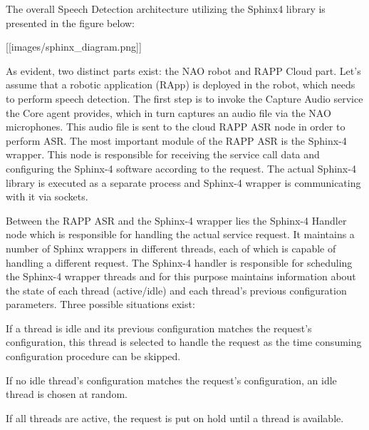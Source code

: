 The overall Speech Detection architecture utilizing the Sphinx4 library is presented in the figure below\-:

\mbox{[}\mbox{[}images/sphinx\-\_\-diagram.\-png\mbox{]}\mbox{]}

As evident, two distinct parts exist\-: the N\-A\-O robot and R\-A\-P\-P Cloud part. Let’s assume that a robotic application (R\-App) is deployed in the robot, which needs to perform speech detection. The first step is to invoke the Capture Audio service the Core agent provides, which in turn captures an audio file via the N\-A\-O microphones. This audio file is sent to the cloud R\-A\-P\-P A\-S\-R node in order to perform A\-S\-R. The most important module of the R\-A\-P\-P A\-S\-R is the Sphinx-\/4 wrapper. This node is responsible for receiving the service call data and configuring the Sphinx-\/4 software according to the request. The actual Sphinx-\/4 library is executed as a separate process and Sphinx-\/4 wrapper is communicating with it via sockets.

Between the R\-A\-P\-P A\-S\-R and the Sphinx-\/4 wrapper lies the Sphinx-\/4 Handler node which is responsible for handling the actual service request. It maintains a number of Sphinx wrappers in different threads, each of which is capable of handling a different request. The Sphinx-\/4 handler is responsible for scheduling the Sphinx-\/4 wrapper threads and for this purpose maintains information about the state of each thread (active/idle) and each thread's previous configuration parameters. Three possible situations exist\-:


\begin{DoxyEnumerate}
\item If a thread is idle and its previous configuration matches the request's configuration, this thread is selected to handle the request as the time consuming configuration procedure can be skipped.
\item If no idle thread's configuration matches the request's configuration, an idle thread is chosen at random.
\item If all threads are active, the request is put on hold until a thread is available.
\end{DoxyEnumerate}

